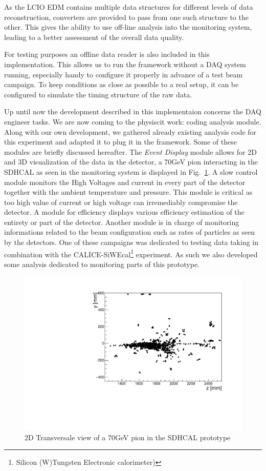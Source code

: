 \documentclass[conference]{IEEEtran}
\begin{document}
As the LCIO EDM contains multiple data structures for different levels of data reconstruction, converters are provided to pass from one such structure to the other. This gives the ability to use off-line analysis into the monitoring system, leading to a better assessment of the overall data quality.

For testing purposes an offline data reader is also included in this implementation. This allows us to run the framework without a DAQ system running, especially handy to configure it properly in advance of a test beam campaign. To keep conditions as close as possible to a real setup, it can be configured to simulate the timing structure of the raw data.

Up until now the development described in this implementaion concerns the DAQ engineer tasks. We are now coming to the physiscit work: coding analysis module. Along with our own development, we gathered already existing analysis code for this experiment and adapted it to plug it in the framework. Some of these modules are briefly discussed hereafter. The \textit{Event Display} module allows for 2D and 3D visualization of the data in the detector, a 70GeV pion interacting in the SDHCAL as seen in the monitoring system is displayed in Fig.~\ref{fig:DQMEventDisplay}. A slow control module monitors the High Voltages and current in every part of the detector together with the ambient temperature and pressure. This module is critical as too high value of current or high voltage can irremediably compromise the detector. A module for efficiency displays various efficiency estimation of the entirety or part of the detector. Another module is in charge of monitoring informations related to the beam configuration such as rates of particles as seen by the detectors. One of these campaigns was dedicated to testing data taking in combination with the CALICE-SiWEcal\footnote{Silicon (W)Tungsten Electronic calorimeter)} experiment. As such we also developed some analysis dedicated to monitoring parts of this prototype.


\begin{figure}[p]
  \begin{center}
    \includegraphics[width=0.8\linewidth]{figs/DQM_SDHCAL_Shower_pi-_70GeV_I732792.pdf}
    \caption{\label{fig:DQMEventDisplay} 2D Transversale view of a 70GeV pion in the SDHCAL prototype}
  \end{center}
\end{figure}
\end{document}
